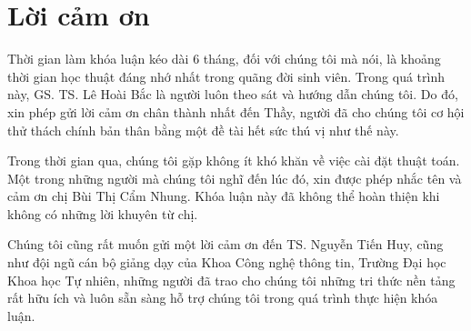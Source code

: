 \chapter*{Lời cảm ơn}
\label{thanks}

Thời gian làm khóa luận kéo dài 6 tháng, đối với chúng tôi mà nói, là khoảng thời gian học thuật đáng nhớ nhất trong quãng đời sinh viên. Trong quá trình này, GS. TS. Lê Hoài Bắc là người luôn theo sát và hướng dẫn chúng tôi. Do đó, xin phép gửi lời cảm ơn chân thành nhất đến Thầy, người đã cho chúng tôi cơ hội thử thách chính bản thân bằng một đề tài hết sức thú vị như thế này.

Trong thời gian qua, chúng tôi gặp không ít khó khăn về việc cài đặt thuật toán. Một trong những người mà chúng tôi nghĩ đến lúc đó, xin được phép nhắc tên và cảm ơn chị Bùi Thị Cẩm Nhung. Khóa luận này đã không thể hoàn thiện khi không có những lời khuyên từ chị.

Chúng tôi cũng rất muốn gửi một lời cảm ơn đến TS. Nguyễn Tiến Huy, cũng như đội ngũ cán bộ giảng dạy của Khoa Công nghệ thông tin, Trường Đại học Khoa học Tự nhiên, những người đã trao cho chúng tôi những tri thức nền tảng rất hữu ích và luôn sẵn sàng hỗ trợ chúng tôi trong quá trình thực hiện khóa luận.
